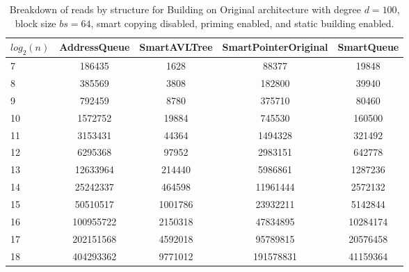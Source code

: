 \begin{table}[]
\centering
\begin{tabular}{|l|c|c|c|c|}
$log_2(n)$ & AddressQueue & SmartAVLTree & SmartPointerOriginal & SmartQueue \\ \hline
7 & 186435 & 1628 & 88377 & 19848 \\ \hline
8 & 385569 & 3808 & 182800 & 39940 \\ \hline
9 & 792459 & 8780 & 375710 & 80460 \\ \hline
10 & 1572752 & 19884 & 745530 & 160500 \\ \hline
11 & 3153431 & 44364 & 1494328 & 321492 \\ \hline
12 & 6295368 & 97952 & 2983151 & 642778 \\ \hline
13 & 12633964 & 214440 & 5986861 & 1287236 \\ \hline
14 & 25242337 & 464598 & 11961444 & 2572132 \\ \hline
15 & 50510517 & 1001786 & 23932211 & 5142844 \\ \hline
16 & 100955722 & 2150318 & 47834895 & 10284174 \\ \hline
17 & 202151568 & 4592018 & 95789815 & 20576458 \\ \hline
18 & 404293362 & 9771012 & 191578831 & 41159364 \\ \hline
\end{tabular}
\caption{Breakdown of reads by structure for Building on Original architecture with degree $d=100$, block size $bs=64$, smart copying disabled, priming enabled, and static building enabled.}
    \label{tab:reads_by_structure_build_d100_bs64_copiesfalse_primetrue_staticinsertiontrue_ptoriginal_movefalse}
\end{table}

